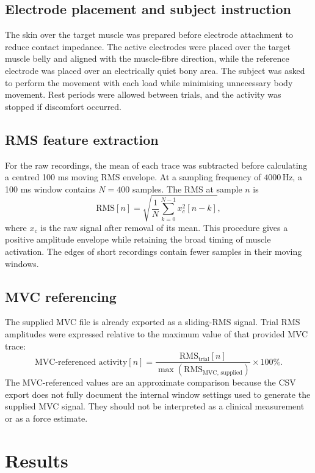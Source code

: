 \documentclass[12pt,a4paper]{article}
\begin{document}
\subsection{Electrode placement and subject instruction}
The skin over the target muscle was prepared before electrode attachment to reduce
contact impedance. The active electrodes were placed over the target muscle belly and
aligned with the muscle-fibre direction, while the reference electrode was placed over
an electrically quiet bony area. The subject was asked to perform the movement with each
load while minimising unnecessary body movement. Rest periods were allowed between
trials, and the activity was stopped if discomfort occurred.

\subsection{RMS feature extraction}
For the raw recordings, the mean of each trace was subtracted before calculating a
centred 100 ms moving RMS envelope. At a sampling frequency of \(4000\,\mathrm{Hz}\), a
100 ms window contains \(N=400\) samples. The RMS at sample \(n\) is
\begin{equation}
  \mathrm{RMS}[n]
  = \sqrt{\frac{1}{N}\sum_{k=0}^{N-1}x_c^2[n-k]},
  \label{eq:rms}
\end{equation}
where \(x_c\) is the raw signal after removal of its mean. This procedure gives a positive
amplitude envelope while retaining the broad timing of muscle activation. The edges of
short recordings contain fewer samples in their moving windows.

\subsection{MVC referencing}
The supplied MVC file is already exported as a sliding-RMS signal. Trial RMS amplitudes
were expressed relative to the maximum value of that provided MVC trace:
\begin{equation}
  \text{MVC-referenced activity}[n]
  = \frac{\mathrm{RMS}_{\text{trial}}[n]}
  {\max(\mathrm{RMS}_{\text{MVC, supplied}})}\times 100\%.
  \label{eq:mvc}
\end{equation}
The MVC-referenced values are an approximate comparison because the CSV export does not
fully document the internal window settings used to generate the supplied MVC signal.
They should not be interpreted as a clinical measurement or as a force estimate.

\section{Results}
\end{document}
